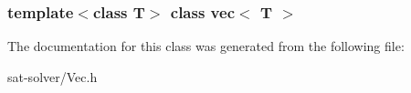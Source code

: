 \subsubsection*{template$<$class \-T$>$ class vec$<$ T $>$}



\-The documentation for this class was generated from the following file\-:\begin{DoxyCompactItemize}
\item 
sat-\/solver/\-Vec.\-h\end{DoxyCompactItemize}
